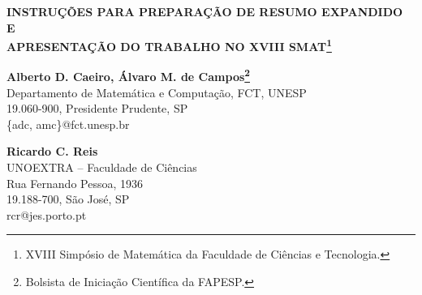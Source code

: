 \documentclass[12pt, a4paper]{article}
\begin{document}


\addtolength{\headwidth}{90pt}	
	\addtolength{\headsep}{-15pt}
	\renewcommand{\headrulewidth}{0pt}	
	\vspace*{0.1cm}		
	
	\makeatletter
	\def\footrule{{\if@fancyplain\let\footrulewidth\plainfootrulewidth\fi
			\vskip-\footruleskip\vskip-\footrulewidth
			\leavevmode\rlap{\hspace*{-0.05in}\rule{0.25\paperwidth}{\footrulewidth}}
			\vskip\footruleskip}}

\makeatother
	\fancyfoot{}
	\fancyfoot[R]{}
	\fancyfoot[L]{}


\begin{center}
	{\large\textbf{INSTRUÇÕES PARA PREPARAÇÃO DE RESUMO EXPANDIDO E \\
	                    APRESENTAÇÃO DO TRABALHO NO XVIII SMAT\footnote{\scriptsize{XVIII Simpósio de Matemática da Faculdade de Ciências e Tecnologia.}}}}
\vspace*{0.5cm}	
	
	\textbf{Alberto D. Caeiro,  Álvaro M. de Campos\footnote{\scriptsize{Bolsista de Iniciação Científica da FAPESP.}}}\\
    {\footnotesize Departamento de Matemática e Computação, FCT, UNESP\\
	19.060-900, Presidente Prudente, SP\\
	\{adc, amc\}@fct.unesp.br}
	
\vspace*{0.5cm}	

	\textbf{Ricardo C. Reis}\\
	{\footnotesize UNOEXTRA -- Faculdade de Ciências \\
	Rua Fernando Pessoa, 1936 \\
	19.188-700, São José, SP \\
	rcr@jes.porto.pt}
\end{center}
\vspace*{-0.5cm}
\end{document}
